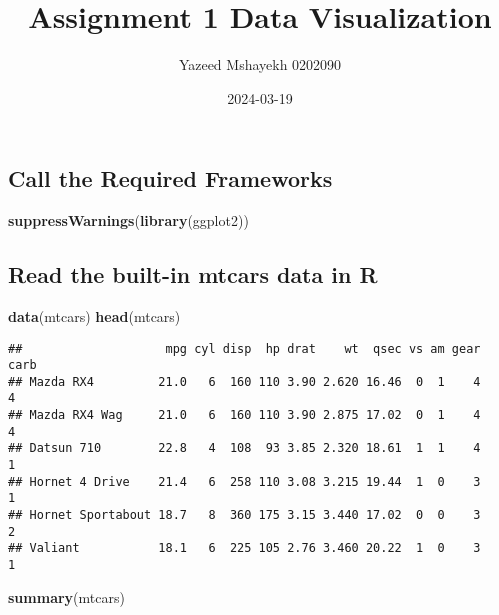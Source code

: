 \documentclass[
]{article}
\title{Assignment 1 Data Visualization}
\author{Yazeed Mshayekh 0202090}
\date{2024-03-19}
\newenvironment{Shaded}{\begin{snugshade}}{\end{snugshade}}
\newcommand{\FunctionTok}[1]{\textcolor[rgb]{0.13,0.29,0.53}{\textbf{#1}}}
\newcommand{\NormalTok}[1]{#1}
\begin{document}
\maketitle

\hypertarget{call-the-required-frameworks}{%
\subsection{Call the Required
Frameworks}\label{call-the-required-frameworks}}

\begin{Shaded}
\begin{Highlighting}[]
\FunctionTok{suppressWarnings}\NormalTok{(}\FunctionTok{library}\NormalTok{(ggplot2))}
\end{Highlighting}
\end{Shaded}

\hypertarget{read-the-built-in-mtcars-data-in-r}{%
\subsection{Read the built-in mtcars data in
R}\label{read-the-built-in-mtcars-data-in-r}}

\begin{Shaded}
\begin{Highlighting}[]
\FunctionTok{data}\NormalTok{(mtcars)}
\FunctionTok{head}\NormalTok{(mtcars)}
\end{Highlighting}
\end{Shaded}

\begin{verbatim}
##                    mpg cyl disp  hp drat    wt  qsec vs am gear carb
## Mazda RX4         21.0   6  160 110 3.90 2.620 16.46  0  1    4    4
## Mazda RX4 Wag     21.0   6  160 110 3.90 2.875 17.02  0  1    4    4
## Datsun 710        22.8   4  108  93 3.85 2.320 18.61  1  1    4    1
## Hornet 4 Drive    21.4   6  258 110 3.08 3.215 19.44  1  0    3    1
## Hornet Sportabout 18.7   8  360 175 3.15 3.440 17.02  0  0    3    2
## Valiant           18.1   6  225 105 2.76 3.460 20.22  1  0    3    1
\end{verbatim}

\begin{Shaded}
\begin{Highlighting}[]
\FunctionTok{summary}\NormalTok{(mtcars)}
\end{Highlighting}
\end{Shaded}
\end{document}
